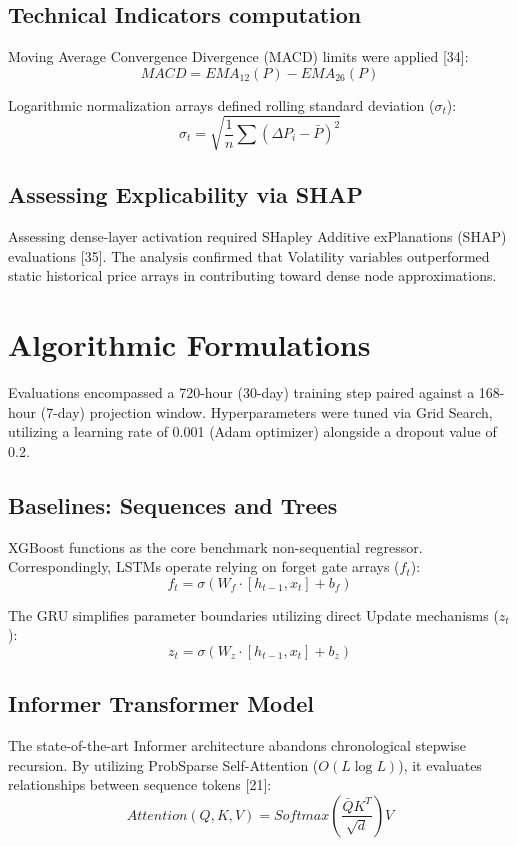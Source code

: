 \documentclass[10pt,a4paper]{article}
\begin{document}
\subsection{Technical Indicators computation}
Moving Average Convergence Divergence (MACD) limits were applied [34]:
\begin{equation}
MACD = EMA_{12}(P) - EMA_{26}(P)
\end{equation}

Logarithmic normalization arrays defined rolling standard deviation ($\sigma_t$):
\begin{equation}
\sigma_t = \sqrt{\frac{1}{n} \sum (\Delta P_i - \bar{P})^2}
\end{equation}

\subsection{Assessing Explicability via SHAP}
Assessing dense-layer activation required SHapley Additive exPlanations (SHAP) evaluations [35]. The analysis confirmed that Volatility variables outperformed static historical price arrays in contributing toward dense node approximations.

\section{Algorithmic Formulations}
Evaluations encompassed a 720-hour (30-day) training step paired against a 168-hour (7-day) projection window. Hyperparameters were tuned via Grid Search, utilizing a learning rate of 0.001 (Adam optimizer) alongside a dropout value of 0.2.

\subsection{Baselines: Sequences and Trees}
XGBoost functions as the core benchmark non-sequential regressor. Correspondingly, LSTMs operate relying on forget gate arrays ($f_t$):
\begin{equation}
f_t = \sigma(W_f \cdot [h_{t-1}, x_t] + b_f)
\end{equation}

The GRU simplifies parameter boundaries utilizing direct Update mechanisms ($z_t$):
\begin{equation}
z_t = \sigma(W_z \cdot [h_{t-1}, x_t] + b_z)
\end{equation}

\subsection{Informer Transformer Model}
The state-of-the-art Informer architecture abandons chronological stepwise recursion. By utilizing ProbSparse Self-Attention ($O(L \log L)$), it evaluates relationships between sequence tokens [21]:
\begin{equation}
Attention(Q, K, V) = Softmax\left(\frac{\bar{Q} K^T}{\sqrt{d}}\right) V
\end{equation}
\end{document}
